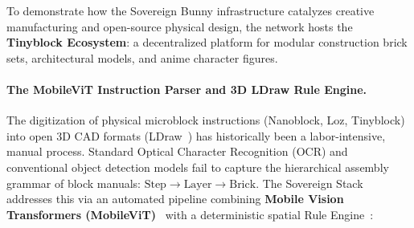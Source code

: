 \documentclass[a4paper,11pt,twoside,parskip=half-,headings=small]{scrartcl}
\begin{document}
To demonstrate how the Sovereign Bunny infrastructure catalyzes creative manufacturing and open-source physical design, the network hosts the \textbf{Tinyblock Ecosystem}: a decentralized platform for modular construction brick sets, architectural models, and anime character figures.

\paragraph{The MobileViT Instruction Parser and 3D LDraw Rule Engine.}
The digitization of physical microblock instructions (Nanoblock, Loz, Tinyblock) into open 3D CAD formats (LDraw~\cite{ldraw2020}) has historically been a labor-intensive, manual process. Standard Optical Character Recognition (OCR) and conventional object detection models fail to capture the hierarchical assembly grammar of block manuals: $\text{Step} \to \text{Layer} \to \text{Brick}$. The Sovereign Stack addresses this via an automated pipeline combining \textbf{Mobile Vision Transformers (MobileViT)}~\cite{mehta2021mobilevit} with a deterministic spatial Rule Engine~\cite{blum2024vision}:
\end{document}
